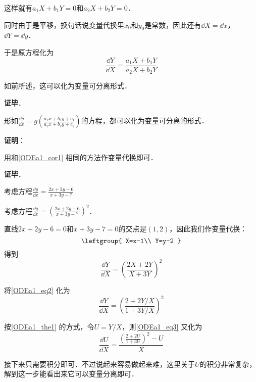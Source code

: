 这样就有$a_1X+b_1Y=0$和$a_2X+b_2Y=0$．

同时由于是平移，换句话说变量代换里$x_0$和$y_0$是常数，因此还有$\dd X=\dd x$，$\dd Y=\dd y$．

于是原方程化为
\begin{equation}
\frac{\dd Y}{\dd X}=\frac{a_1X+b_1Y}{a_2X+b_2Y}
\end{equation}

如前所述，这可以化为变量可分离形式．

\textbf{证毕}．

\begin{corollary}{}
形如$\frac{\dd y}{\dd x}=g(\frac{a_1x+b_1y+c_1}{a_2x+b_2y+c_2})$的方程，都可以化为变量可分离的形式．
\end{corollary}

\textbf{证明}：

用和\autoref{ODEa1_cor1} 相同的方法作变量代换即可．

\textbf{证毕}．





\begin{example}{}
考虑方程$\frac{\dd y}{\dd x}=\frac{2x+2y-6}{x+3y-7}$
\end{example}








\begin{example}{}
考虑方程$\frac{\dd y}{\dd x}=(\frac{2x+2y-6}{x+3y-7})^2$．

直线$2x+2y-6=0$和$x+3y-7=0$的交点是$(1, 2)$，因此我们作变量代换：
\begin{equation}
\leftgroup{
    X=x-1\\
    Y=y-2
}
\end{equation}
得到
\begin{equation}\label{ODEa1_eq2}
\frac{\dd Y}{\dd X}=(\frac{2X+2Y}{X+3Y})^2
\end{equation}

将\autoref{ODEa1_eq2} 化为
\begin{equation}\label{ODEa1_eq3}
\frac{\dd Y}{\dd X}=(\frac{2+2Y/X}{1+3Y/X})^2
\end{equation}

按\autoref{ODEa1_the1} 的方式，令$U=Y/X$，则\autoref{ODEa1_eq3} 又化为
\begin{equation}
\frac{\dd U}{\dd X}=\frac{(\frac{2+2U}{1+3U})^2-U}{X}
\end{equation}

接下来只需要积分即可．不过说起来容易做起来难，这里关于$U$的积分非常复杂，解到这一步能看出来它可以变量分离即可．

\end{example}









